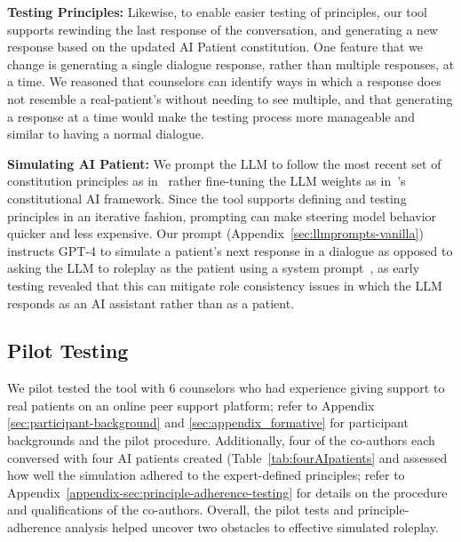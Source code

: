 \documentclass[11pt]{article}
\begin{document}
\textbf{Testing Principles:} Likewise, to enable easier testing of principles, our tool supports rewinding the last response of the conversation, and generating a new response based on the updated AI Patient constitution. 
One feature that we change is generating a single dialogue response, rather than multiple responses, at a time. We reasoned that counselors can identify ways in which a response does not resemble a real-patient's without needing to see multiple, and that generating a response at a time would make the testing process more manageable and similar to having a normal dialogue. 

\textbf{Simulating AI Patient:} We prompt the LLM to follow the most recent set of constitution principles as in~\citet{petridis2023constitutionmaker} rather fine-tuning the LLM weights as in~\citet{bai2022constitutional}'s constitutional AI framework. Since the tool supports defining and testing principles in an iterative fashion, prompting can make steering model behavior quicker and less expensive. 
Our prompt (Appendix~\ref{sec:llmprompts-vanilla}) instructs GPT-4 to simulate a patient's next response in a dialogue as opposed to asking the LLM to roleplay as the patient using a system prompt~\cite{zhou2024real}, as early testing revealed that this can mitigate role consistency issues in which the LLM responds as an AI assistant rather than as a patient. 


\subsection{Pilot Testing} \label{sec:formative-tests}

We pilot tested the tool with 6 counselors who had experience giving support to real patients on an online peer support platform; refer to Appendix \ref{sec:participant-background} and \ref{sec:appendix_formative} for participant backgrounds and the pilot procedure. 
Additionally, four of the co-authors each conversed with four AI patients created (Table~\ref{tab:fourAIpatients} and assessed how well the simulation adhered to the expert-defined principles; refer to Appendix~\ref{appendix-sec:principle-adherence-testing} for details on the procedure and qualifications of the co-authors. Overall, the pilot tests and principle-adherence analysis helped uncover two obstacles to effective simulated roleplay. 
\end{document}
